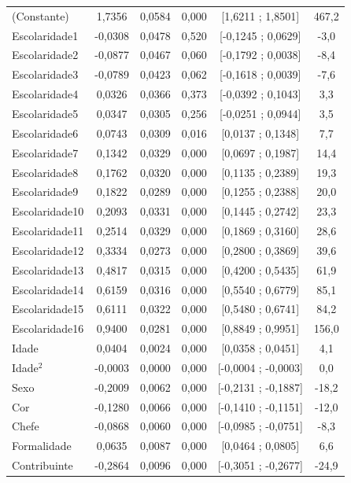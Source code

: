 \documentclass[12pt,a4paper,header]{abnt}
\begin{document}
\begin{center}
\begin{longtable}{lccccc}
(Constante) & 1,7356 & 0,0584 & 0,000 & [1,6211 ; 1,8501] & 467,2 \\
Escolaridade1 & -0,0308 & 0,0478 & 0,520 & [-0,1245 ; 0,0629] & -3,0 \\
Escolaridade2 & -0,0877 & 0,0467 & 0,060 & [-0,1792 ; 0,0038] & -8,4 \\
Escolaridade3 & -0,0789 & 0,0423 & 0,062 & [-0,1618 ; 0,0039] & -7,6 \\
Escolaridade4 & 0,0326 & 0,0366 & 0,373 & [-0,0392 ; 0,1043] & 3,3 \\
Escolaridade5 & 0,0347 & 0,0305 & 0,256 & [-0,0251 ; 0,0944] & 3,5 \\
Escolaridade6 & 0,0743 & 0,0309 & 0,016 & [0,0137 ; 0,1348] & 7,7 \\
Escolaridade7 & 0,1342 & 0,0329 & 0,000 & [0,0697 ; 0,1987] & 14,4 \\
Escolaridade8 & 0,1762 & 0,0320 & 0,000 & [0,1135 ; 0,2389] & 19,3 \\
Escolaridade9 & 0,1822 & 0,0289 & 0,000 & [0,1255 ; 0,2388] & 20,0 \\
Escolaridade10 & 0,2093 & 0,0331 & 0,000 & [0,1445 ; 0,2742] & 23,3 \\
Escolaridade11 & 0,2514 & 0,0329 & 0,000 & [0,1869 ; 0,3160] & 28,6 \\
Escolaridade12 & 0,3334 & 0,0273 & 0,000 & [0,2800 ; 0,3869] & 39,6 \\
Escolaridade13 & 0,4817 & 0,0315 & 0,000 & [0,4200 ; 0,5435] & 61,9 \\
Escolaridade14 & 0,6159 & 0,0316 & 0,000 & [0,5540 ; 0,6779] & 85,1 \\
Escolaridade15 & 0,6111 & 0,0322 & 0,000 & [0,5480 ; 0,6741] & 84,2 \\
Escolaridade16 & 0,9400 & 0,0281 & 0,000 & [0,8849 ; 0,9951] & 156,0 \\
Idade & 0,0404 & 0,0024 & 0,000 & [0,0358 ; 0,0451] & 4,1 \\
Idade$^2$ & -0,0003 & 0,0000 & 0,000 & [-0,0004 ; -0,0003] & 0,0 \\
Sexo & -0,2009 & 0,0062 & 0,000 & [-0,2131 ; -0,1887] & -18,2 \\
Cor & -0,1280 & 0,0066 & 0,000 & [-0,1410 ; -0,1151] & -12,0 \\
Chefe & -0,0868 & 0,0060 & 0,000 & [-0,0985 ; -0,0751] & -8,3 \\
Formalidade & 0,0635 & 0,0087 & 0,000 & [0,0464 ; 0,0805] & 6,6 \\
Contribuinte & -0,2864 & 0,0096 & 0,000 & [-0,3051 ; -0,2677] & -24,9 \\

\end{longtable}
\end{center}
\end{document}
